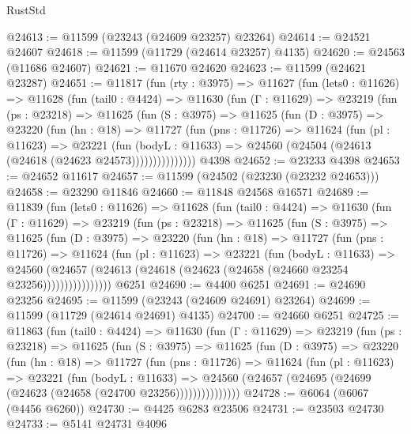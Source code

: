 \begin{lexlean}{RustStd}
\begin{coremodule}
@24613 := @11599 (@23243 (@24609 @23257) @23264)
@24614 := @24521 @24607
@24618 := @11599 (@11729 (@24614 @23257) @4135)
@24620 := @24563 (@11686 @24607)
@24621 := @11670 @24620
@24623 := @11599 (@24621 @23287)
@24651 := @11817
    (fun (rty : @3975) =>
    @11627
      (fun (lets0 : @11626) =>
      @11628
        (fun (tail0 : @4424) =>
        @11630
          (fun (Γ : @11629) =>
          @23219
            (fun (ps : @23218) =>
            @11625
              (fun (S : @3975) =>
              @11625
                (fun (D : @3975) =>
                @23220
                  (fun (hn : @18) =>
                  @11727
                    (fun (pns : @11726) =>
                    @11624
                      (fun (pl : @11623) =>
                      @23221
                        (fun (bodyL : @11633) =>
                        @24560 (@24504 (@24613 (@24618 (@24623 @24573)))))))))))))))
    @4398
@24652 := @23233 @4398
@24653 := @24652 @11617
@24657 := @11599 (@24502 (@23230 (@23232 @24653)))
@24658 := @23290 @11846
@24660 := @11848 @24568 @16571
@24689 := @11839
    (fun (lets0 : @11626) =>
    @11628
      (fun (tail0 : @4424) =>
      @11630
        (fun (Γ : @11629) =>
        @23219
          (fun (ps : @23218) =>
          @11625
            (fun (S : @3975) =>
            @11625
              (fun (D : @3975) =>
              @23220
                (fun (hn : @18) =>
                @11727
                  (fun (pns : @11726) =>
                  @11624
                    (fun (pl : @11623) =>
                    @23221
                      (fun (bodyL : @11633) =>
                      @24560
                        (@24657
                          (@24613 (@24618 (@24623 (@24658 (@24660 @23254 @23256))))))))))))))))
    @6251
@24690 := @4400 @6251
@24691 := @24690 @23256
@24695 := @11599 (@23243 (@24609 @24691) @23264)
@24699 := @11599 (@11729 (@24614 @24691) @4135)
@24700 := @24660 @6251
@24725 := @11863
    (fun (tail0 : @4424) =>
    @11630
      (fun (Γ : @11629) =>
      @23219
        (fun (ps : @23218) =>
        @11625
          (fun (S : @3975) =>
          @11625
            (fun (D : @3975) =>
            @23220
              (fun (hn : @18) =>
              @11727
                (fun (pns : @11726) =>
                @11624
                  (fun (pl : @11623) =>
                  @23221
                    (fun (bodyL : @11633) =>
                    @24560 (@24657 (@24695 (@24699 (@24623 (@24658 (@24700 @23256)))))))))))))))
@24728 := @6064 (@6067 (@4456 @6260))
@24730 := @4425 @6283 @23506
@24731 := @23503 @24730
@24733 := @5141 @24731 @4096

\end{coremodule}
\end{lexlean}
